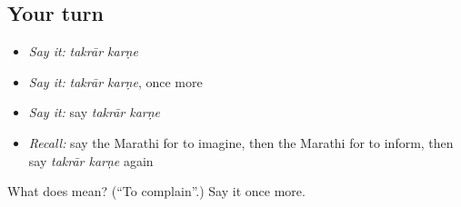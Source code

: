 \subsection*{Your turn}
\begin{itemize}
\raggedright
  \item \emph{Say it:} \emph{takrār karṇe}
  \item \emph{Say it:} \emph{takrār karṇe}, once more
  \item \emph{Say it:} say \emph{takrār karṇe}
  \item \emph{Recall:} say the Marathi for to imagine, then the Marathi for to inform, then say \emph{takrār karṇe} again
\end{itemize}

\begin{tcolorbox}[breakable,colback=teal!4,colframe=teal!35!black,title={Before you move on}]
What does   mean? (\textquotedblleft{}To complain\textquotedblright{}.) Say it once more.
\end{tcolorbox}
